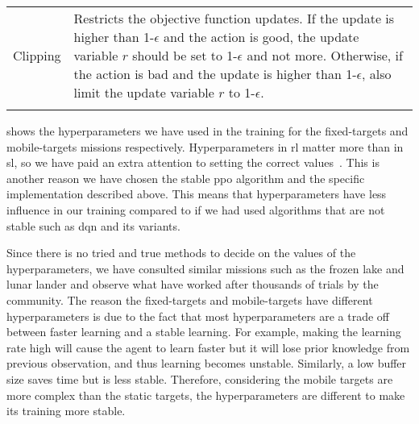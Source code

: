 \documentclass[../main.tex]{subfiles}
\begin{document}
\begin{table}[tb]
\begin{tabularx}{\textwidth}{ X p{12.3cm} }
        Clipping
                & 
                Restricts the objective function updates.
                If the update is higher than 1-$\epsilon$ and the
                action is good, the update variable $r$ should be set
                to 1-$\epsilon$ and not more.
                Otherwise, if the action is bad and the update is
                higher than 1-$\epsilon$, also limit the update
                variable $r$ to 1-$\epsilon$.
                \\ \addlinespace
        
        \bottomrule
    \end{tabularx}
\end{table}

 shows the hyperparameters we have used in
the training for the fixed-targets and mobile-targets missions
respectively.
Hyperparameters in \gls{rl} matter more than in \gls{sl}, so we have
paid an extra attention to setting the correct
values~\cite{hyperparameters}.
This is another reason we have chosen the stable \gls{ppo}
algorithm and the specific implementation described above.
This means that hyperparameters have less influence in our training
compared to if we had used algorithms that are not stable such as 
\gls{dqn} and its variants.

Since there is no tried and true methods to decide on the values of
the hyperparameters,  we have consulted similar missions such as the frozen
lake and lunar lander and observe what have worked after thousands of
trials by the community.
The reason the fixed-targets and mobile-targets have different
hyperparameters is due to the fact that
most hyperparameters are a trade off between faster learning and a
stable learning.
For example, making the learning rate high will cause the agent to
learn faster but it will lose prior knowledge from previous
observation, and thus learning becomes unstable.
Similarly, a low buffer size saves time but is less stable. 
Therefore, considering the mobile targets are more complex than the
static targets, the hyperparameters are different to make its training
more stable.
\end{document}
